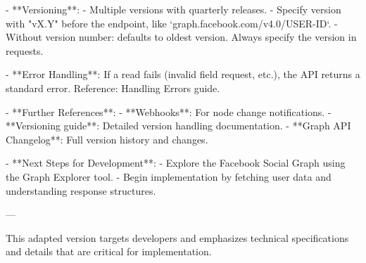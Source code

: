 - **Versioning**:
  - Multiple versions with quarterly releases.
  - Specify version with "vX.Y" before the endpoint, like `graph.facebook.com/v4.0/USER-ID`.
  - Without version number: defaults to oldest version. Always specify the version in requests.
  
- **Error Handling**: If a read fails (invalid field request, etc.), the API returns a standard error. Reference: Handling Errors guide.

- **Further References**:
  - **Webhooks**: For node change notifications.
  - **Versioning guide**: Detailed version handling documentation.
  - **Graph API Changelog**: Full version history and changes.

- **Next Steps for Development**:
  - Explore the Facebook Social Graph using the Graph Explorer tool.
  - Begin implementation by fetching user data and understanding response structures.

---

This adapted version targets developers and emphasizes technical specifications and details that are critical for implementation.